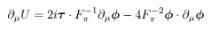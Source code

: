 \begin{equation}
\partial_\mu U = 2i \mbox{\boldmath$\tau$}\cdot F_\pi^{-1} \partial_\mu \mbox{\boldmath$\phi$}-4F_\pi^{-2} \mbox{\boldmath$\phi$}\cdot \partial_\mu \mbox{\boldmath$\phi$}
\end{equation}

